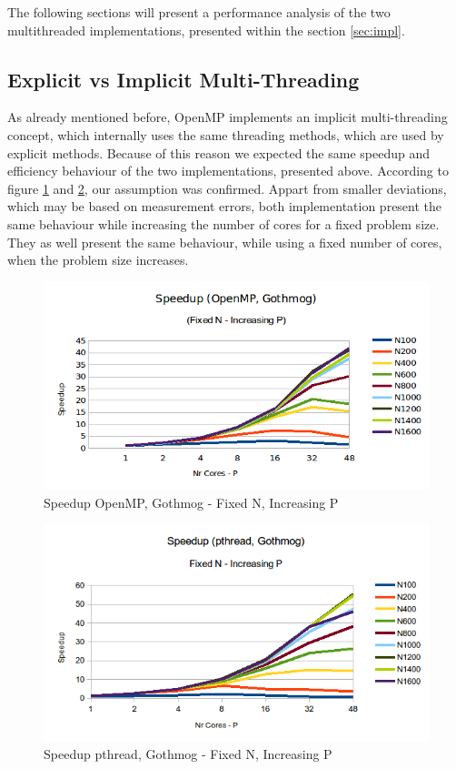 \documentclass[conference]{IEEEtran}
\begin{document}
The following sections will present a performance analysis of the two multithreaded implementations, presented within the section \ref{sec:impl}. 

\subsection{Explicit vs Implicit Multi-Threading}
\label{sec:analysis:pthread}

As already mentioned before, OpenMP implements an implicit multi-threading concept, which internally uses the same threading methods, which are used by explicit methods. Because of this reason we expected the same speedup and efficiency behaviour of the two implementations, presented above. According to figure \ref{pic:omp_speedup_fixed-n} and \ref{pic:pthread_speedup_fixed-n}, our assumption was confirmed. Appart from smaller deviations, which may be based on measurement errors, both implementation present the same behaviour while increasing the number of cores for a fixed problem size. They as well present the same behaviour, while using a fixed number of cores, when the problem size increases. 

\begin{figure}[h]
  \centering
  \includegraphics[scale=0.42]{pic/omp_gothmog_speedup-fixed-n.png} 
  \caption{Speedup OpenMP, Gothmog - Fixed N, Increasing P}
  \label{pic:omp_speedup_fixed-n}
\end{figure}

\begin{figure}[h]
  \centering
  \includegraphics[scale=0.55]{pic/pthread_gothmog_speedup-fixed-n.png} 
  \caption{Speedup pthread, Gothmog - Fixed N, Increasing P}
  \label{pic:pthread_speedup_fixed-n}
\end{figure}
\end{document}
